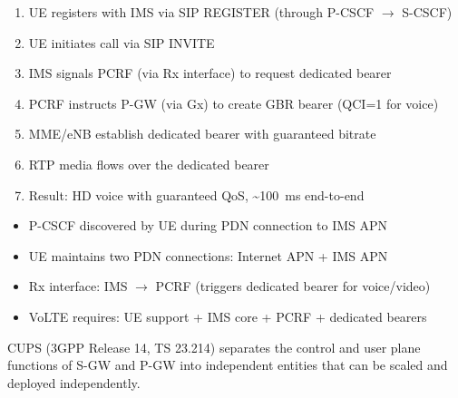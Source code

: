 
\begin{enumerate}
\def\labelenumi{\arabic{enumi}.}
\tightlist
\item
  UE registers with IMS via SIP REGISTER (through P-CSCF \ensuremath{\to} S-CSCF)
\item
  UE initiates call via SIP INVITE
\item
  IMS signals PCRF (via Rx interface) to request dedicated bearer
\item
  PCRF instructs P-GW (via Gx) to create GBR bearer (QCI=1 for voice)
\item
  MME/\allowbreak{}eNB establish dedicated bearer with guaranteed bitrate
\item
  RTP media flows over the dedicated bearer
\item
  Result: HD voice with guaranteed QoS, \textasciitilde{}100~ms end-to-end
\end{enumerate}


\begin{itemize}
\tightlist
\item
  P-CSCF discovered by UE during PDN connection to IMS APN
\item
  UE maintains two PDN connections: Internet APN + IMS APN
\item
  Rx interface: IMS \ensuremath{\to} PCRF (triggers dedicated bearer for voice/\allowbreak{}video)
\item
  VoLTE requires: UE support + IMS core + PCRF + dedicated bearers
\end{itemize}




\CNchained{}

CUPS (3GPP Release 14, TS 23.214) separates the control and user plane functions of S-GW and P-GW into independent entities that can be scaled and deployed independently.




